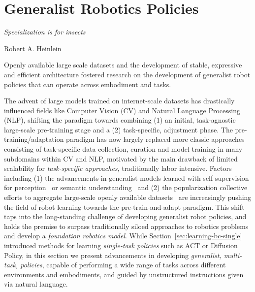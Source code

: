 \section{Generalist Robotics Policies}
\label{sec:learning-bc-generalist}

\epigraph{\textit{Specialization is for insects}}{Robert A. Heinlein}

\begin{tldr}
Openly available large scale datasets and the development of stable, expressive and efficient architecture fostered research on the development of generalist robot policies that can operate across embodiment and tasks.
\end{tldr}

The advent of large models trained on internet-scale datasets has drastically influenced fields like Computer Vision (CV) and Natural Language Processing (NLP), shifting the paradigm towards combining (1) an initial, task-agnostic large-scale pre-training stage and a (2) task-specific, adjustment phase.
The pre-training/adaptation paradigm has now largely replaced more classic approaches consisting of task-specific data collection, curation and model training in many subdomains within CV and NLP, motivated by the main drawback of limited scalability for \emph{task-specific approaches}, traditionally labor intensive.
Factors including (1) the advancements in generalist models learned with self-supervision for perception~\citep{oquabDINOv2LearningRobust2024} or semantic understanding~\citep{devlinBERTPretrainingDeep2019} and (2) the popularization collective efforts to aggregate large-scale openly available datasets~\citep{collaborationOpenXEmbodimentRobotic2025,khazatskyDROIDLargeScaleInTheWild2025} are increasingly pushing the field of robot learning towards the pre-train-and-adapt paradigm.
This shift taps into the long-standing challenge of developing generalist robot policies, and holds the premise to surpass traditionally siloed approaches to robotics problems and develop a \emph{foundation robotics model}.
While Section~\ref{sec:learning-bc-single} introduced methods for learning \emph{single-task policies} such as ACT or Diffusion Policy, in this section we present advancements in developing \emph{generalist, multi-task, policies}, capable of performing a wide range of tasks across different environments and embodiments, and guided by unstructured instructions given via natural language.

